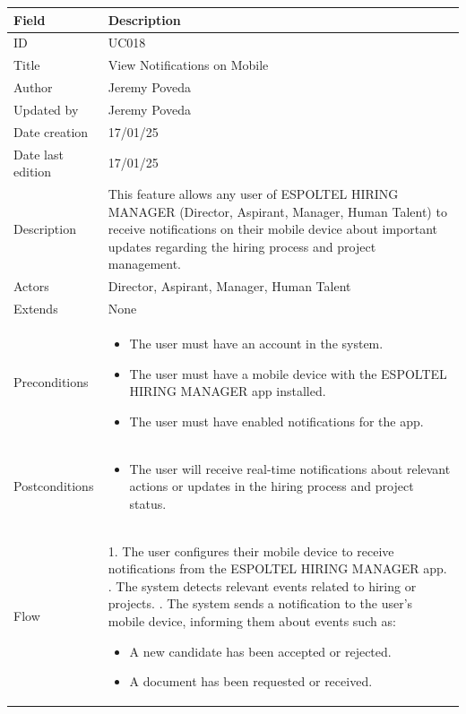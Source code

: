 \documentclass{scrreprt}
\begin{document}
\begin{table}[H]
	\centering
	\begin{tabular}{|p{3cm}|p{10cm}|}
		\hline
		\textbf{Field} & \textbf{Description} \\ \hline
		ID & UC018 \\ \hline
		Title & View Notifications on Mobile \\ \hline
		Author & Jeremy Poveda \\ \hline
		Updated by & Jeremy Poveda \\ \hline
		Date creation & 17/01/25 \\ \hline
		Date last edition & 17/01/25 \\ \hline
		Description & 
		This feature allows any user of ESPOLTEL HIRING MANAGER (Director, Aspirant, Manager, Human Talent) to receive notifications on their mobile device about important updates regarding the hiring process and project management. \\ \hline
		Actors & Director, Aspirant, Manager, Human Talent \\ \hline
		Extends & None \\ \hline
		Preconditions & 
		\begin{itemize}
			\item The user must have an account in the system.
			\item The user must have a mobile device with the ESPOLTEL HIRING MANAGER app installed.
			\item The user must have enabled notifications for the app.
		\end{itemize} \\ \hline
		Postconditions & 
		\begin{itemize}
			\item The user will receive real-time notifications about relevant actions or updates in the hiring process and project status.
		\end{itemize} \\ \hline
		Flow & 
		1. The user configures their mobile device to receive notifications from the ESPOLTEL HIRING MANAGER app. \newline
		2. The system detects relevant events related to hiring or projects. \newline
		3. The system sends a notification to the user's mobile device, informing them about events such as:
		\begin{itemize}
			\item A new candidate has been accepted or rejected.
			\item A document has been requested or received.

\end{itemize}
\end{tabular}
\end{table}
\end{document}
